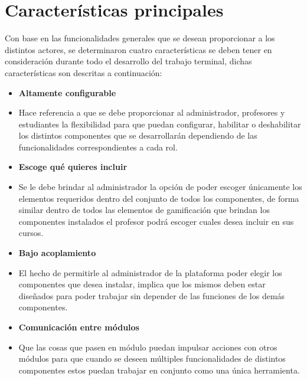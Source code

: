 \section{Características principales}

 Con base en las funcionalidades generales que se desean proporcionar a los distintos
 actores, se determinaron cuatro características se deben tener en consideración
 durante todo el desarrollo del trabajo terminal, dichas características son
 descritas a continuación:


    \begin{multicols}{2}
    \begin{itemize}
    \item{\bf\color{primary} Altamente configurable }

    \item[] Hace referencia a que se debe proporcionar al administrador, profesores
            y estudiantes la flexibilidad para que puedan configurar, habilitar o
            deshabilitar los distintos componentes que se desarrollarán dependiendo
            de las funcionalidades correspondientes a cada rol.

    \item{\bf\color{primary} Escoge qué quieres incluir }

    \item[] Se le debe brindar al administrador la opción de poder escoger únicamente
            los elementos requeridos dentro del conjunto de todos los componentes, de
            forma similar dentro de todos las elementos de gamificación que brindan
            los componentes instalados el profesor podrá escoger cuales desea incluir
            en sus cursos.

    \item{\bf\color{primary} Bajo acoplamiento }

    \item[] El hecho de permitirle al administrador de la plataforma poder elegir los
            componentes que desea instalar, implica que los mismos deben estar
            diseñados para poder trabajar sin depender de las funciones de los demás
            componentes.

    \item{\bf\color{primary} Comunicación entre módulos }

    \item[] Que las cosas que pasen en módulo puedan impulsar acciones con otros
            módulos para que cuando se deseen múltiples funcionalidades de distintos
            componentes estos puedan trabajar en conjunto como una única herramienta.
    \end{itemize}
    \end{multicols}

